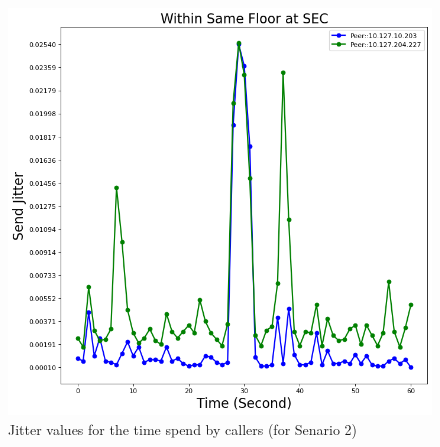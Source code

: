 	\begin{figure}[!b]
		\begin{minipage}{\textwidth}
			\includegraphics[scale=0.38]{Images/experiment/senarios/df_in_floor.png}
		\end{minipage}
		\caption{Jitter values for the time spend by callers (for Senario 2)}
		\label{fig:scene-out-2}
	\end{figure}

